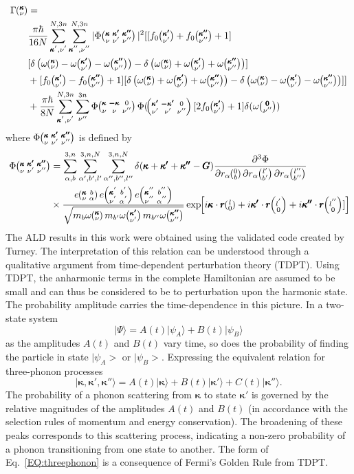 \begin{equation}\label{EQ:Gamma_anh}
\begin{split}
\Gamma \kv &= \\
&\frac{\pi\hbar}{16N}\SUM[']\SUM['']|\Phi\kvkvpkvpp|^2[[f_0\kvp+f_0\kvpp+1]\\
&[\delta\left(\omega\kv-\omega\kvp-\omega\kvpp\right)-\delta\left(\omega\kv+\omega\kvp+\omega\kvpp\right)]\\
&+[f_0\kvp-f_0\kvpp+1][\delta\left(\omega\kv+\omega\kvp+\omega\kvpp\right)-\delta\left(\omega\kv-\omega\kvp-\omega\kvpp\right)]]\\
&+\frac{\pi\hbar}{8N}\SUM[']\sum_{\nu''}^{3n}\Phi\kvOv\Phi(\kvpOv[2f_0\kvp+1]\delta(\omega\Ovpp)
\end{split}
\end{equation}
%
where $\Phi\mspace{-4.0mu}\left(\mspace{-8.0mu} \begin{smallmatrix}&\pmb{\kappa}&\pmb{\kappa'}&\pmb{\kappa''} \\&\nu&\nu'&\nu''\end{smallmatrix} \mspace{-3.0mu}\right)$ is defined by
%
\begin{equation}\label{EQ:Phi_anh}
\begin{split}
\Phi\kvkvpkvpp&=\sum_{\alpha,b}^{3,n}\sum_{\alpha',b',l'}^{3,n,N}\sum_{\alpha'',b'',l''}^{3,n,N}\delta(\pmb{\kappa}+\pmb{\kappa'}+\pmb{\kappa''}-\pmb{G})\frac{\partial^3\Phi}{\partial r_\alpha \Ob \partial r_\alpha \lbp \partial r_\alpha \lbpp}\\
&\times \frac{e \kvba e \kvbain{'}e \kvbain{''}}{\sqrt{m_{b}\omega\kv
m_{b'}\omega\kvp m_{b''}\omega\kvpp}}\EXP{i\pmb{\kappa}\cdot \pmb{r}\lO+i\pmb{\kappa'}\cdot \pmb{r}\lOin{'}+i\pmb{\kappa''}\cdot \pmb{r}\lOin{''}]}
\end{split}
\end{equation}
%
The ALD results in this work were obtained using the validated code created by Turney.\cite{turneythesis} The interpretation of this relation can be understood through a qualitative argument from time-dependent perturbation theory (TDPT). Using TDPT, the anharmonic terms in the complete Hamiltonian are assumed to be small and can thus be considered to be to perturbation upon the harmonic state. The probability amplitude carries the time-dependence in this picture. In a two-state system
%
\begin{equation}
|\Psi\rangle=A(t)|\psi_A\rangle+B(t)|\psi_B\rangle
\end{equation}
%
as the amplitudes $A(t)$ and $B(t)$ vary time, so does the probability of finding the particle in state $|\psi_A>$ or $|\psi_B>$. Expressing the equivalent relation for three-phonon processes
%
\begin{equation}\label{EQ:threephonon}
|\bm{\kappa},\bm{\kappa}',\bm{\kappa}''\rangle=A(t)|\bm{\kappa}\rangle+B(t)|\bm{\kappa}'\rangle+C(t)|\bm{\kappa}''\rangle.
\end{equation}
%
The probability of a phonon scattering from $\bm{\kappa}$ to state $\bm{\kappa}'$ is governed by the relative magnitudes of the amplitudes $A(t)$ and $B(t)$ (in accordance with the selection rules of momentum and energy conservation). The broadening of these peaks corresponds to this scattering process, indicating a non-zero probability of a phonon transitioning from one state to another. The form of Eq.~\ref{EQ:threephonon} is a consequence of Fermi's Golden Rule from TDPT.

